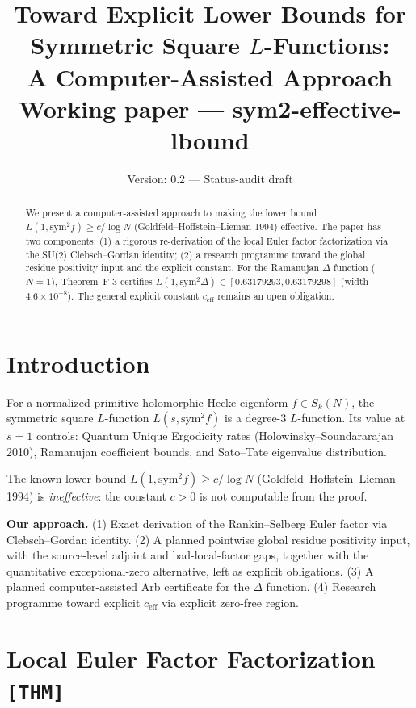 \documentclass[12pt]{article}
\title{Toward Explicit Lower Bounds for Symmetric Square $L$-Functions:\\
A Computer-Assisted Approach\\[6pt]
\large Working paper --- sym2-effective-lbound}
\author{}
\date{Version: 0.2 --- Status-audit draft}
\begin{document}
\maketitle

\begin{abstract}
We present a computer-assisted approach to making the lower bound
$L(1,\mathrm{sym}^2 f) \geq c/\log N$ (Goldfeld--Hoffstein--Lieman 1994) effective.
The paper has two components: (1) a rigorous re-derivation of the local Euler factor
factorization via the SU(2) Clebsch--Gordan identity; (2) a research programme
toward the global residue positivity input and the explicit constant.
For the Ramanujan $\Delta$ function ($N=1$), Theorem~F-3 certifies
$L(1,\mathrm{sym}^2\Delta) \in [0.63179293, 0.63179298]$ (width $4.6\times10^{-8}$).
The general explicit constant $c_{\mathrm{eff}}$ remains an open obligation.
\end{abstract}

\tableofcontents

\section{Introduction}

For a normalized primitive holomorphic Hecke eigenform $f\in S_k(N)$, the symmetric
square $L$-function $L(s,\mathrm{sym}^2 f)$ is a degree-3 $L$-function. Its value at $s=1$
controls: Quantum Unique Ergodicity rates (Holowinsky--Soundararajan 2010),
Ramanujan coefficient bounds, and Sato--Tate eigenvalue distribution.

The known lower bound $L(1,\mathrm{sym}^2 f) \geq c/\log N$ (Goldfeld--Hoffstein--Lieman 1994)
is \emph{ineffective}: the constant $c>0$ is not computable from the proof.

\textbf{Our approach.}
(1) Exact derivation of the Rankin--Selberg Euler factor via Clebsch--Gordan identity.
(2) A planned pointwise global residue positivity input, with the source-level
    adjoint and bad-local-factor gaps, together with the quantitative
    exceptional-zero alternative, left as explicit obligations.
(3) A planned computer-assisted Arb certificate for the $\Delta$ function.
(4) Research programme toward explicit $c_{\mathrm{eff}}$ via explicit zero-free region.

\section{Local Euler Factor Factorization \texttt{[THM]}}
\end{document}
